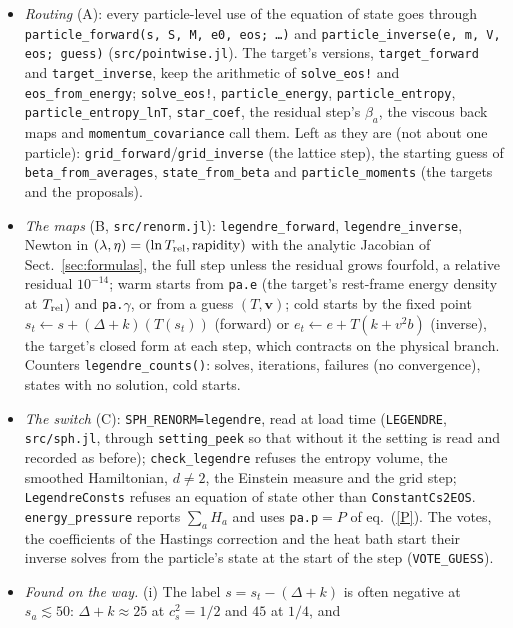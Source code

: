\documentclass[11pt,aps,preprint,nofootinbib,superscriptaddress,tightenlines]{revtex4-2}
\def\Eq#1{eq.~(\ref{#1})}
\def\Sect#1{Sect.~\ref{#1}}
\begin{document}
\begin{itemize}
\item \emph{Routing} (A): every particle-level use of the equation of state goes through \texttt{particle\_forward(s, S, M, e0, eos; \ldots)} and
  \texttt{particle\_inverse(e, m, V, eos; guess)} (\nolinkurl{src/pointwise.jl}).  The target's versions, \texttt{target\_forward} and \texttt{target\_inverse},
  keep the arithmetic of \texttt{solve\_eos!} and \texttt{eos\_from\_energy}; \texttt{solve\_eos!}, \texttt{particle\_energy}, \texttt{particle\_entropy},
  \texttt{particle\_entropy\_lnT}, \texttt{star\_coef}, the residual step's $\beta_a$, the viscous back maps and \texttt{momentum\_covariance} call them.  Left as
  they are (not about one particle): \texttt{grid\_forward}/\texttt{grid\_inverse} (the lattice step), the starting guess of \texttt{beta\_from\_averages},
  \texttt{state\_from\_beta} and \texttt{particle\_moments} (the targets and the proposals).
\item \emph{The maps} (B, \nolinkurl{src/renorm.jl}): \texttt{legendre\_forward}, \texttt{legendre\_inverse}, Newton in $(\lambda,\eta)=(\ln T_{\rm rel},\text{rapidity})$ with
  the analytic Jacobian of \Sect{sec:formulas}, the full step unless the residual grows fourfold, a relative residual $10^{-14}$; warm starts from
  \texttt{pa.e} (the target's rest-frame energy density at $T_{\rm rel}$) and \texttt{pa.}$\gamma$, or from a guess $(T,\bm v)$; cold starts by the fixed
  point $s_t\leftarrow s+(\Delta+k)(T(s_t))$ (forward) or $e_t\leftarrow e+T(k+v^2b)$ (inverse), the target's closed form at each step, which contracts on the
  physical branch.  Counters \texttt{legendre\_counts()}: solves, iterations, failures (no convergence), states with no solution, cold starts.
\item \emph{The switch} (C): \texttt{SPH\_RENORM=legendre}, read at load time (\texttt{LEGENDRE}, \nolinkurl{src/sph.jl}, through \texttt{setting\_peek} so that
  without it the setting is read and recorded as before); \texttt{check\_legendre} refuses the entropy volume, the smoothed Hamiltonian, $d\ne2$, the
  Einstein measure and the grid step; \texttt{LegendreConsts} refuses an equation of state other than \texttt{ConstantCs2EOS}.  \texttt{energy\_pressure}
  reports $\sum_aH_a$ and uses \texttt{pa.p}$=P$ of \Eq{P}.  The votes, the coefficients of the Hastings correction and the heat bath start their inverse
  solves from the particle's state at the start of the step (\texttt{VOTE\_GUESS}).
\item \emph{Found on the way.}  (i) The label $s=s_t-(\Delta+k)$ is often negative at $s_a\lesssim50$: $\Delta+k\approx25$ at $c_s^2=1/2$ and $45$ at $1/4$, and

\end{itemize}
\end{document}
